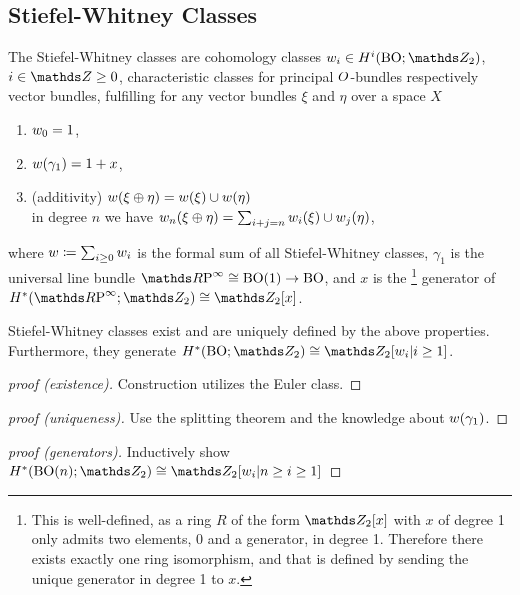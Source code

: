 \subsection{Stiefel-Whitney Classes}
\begin{Def}
  The Stiefel-Whitney classes are cohomology classes
  $w_i\in H^i(\BO;\Zmod2)$, $i\in\Z\geq0$,
  \idest characteristic classes for principal $O$-bundles
  respectively vector bundles, fulfilling
  for any vector bundles $\xi$ and $\eta$ over a space $X$
  \begin{enumerate}
  \item $\w_0%
    = 1$,
  \item $w(\gamma_1) = 1 + x$,
  \item (additivity) $w(\xi \oplus \eta) = w(\xi)\cup w(\eta)$
    \\\idest in degree $n$ we have
    $w_n(\xi\oplus\eta) = \sum_{i+j=n}w_i(\xi) \cup w_j(\eta)$,
  \end{enumerate}
  where
  $w\coloneqq\sum_{i\geq 0}w_i$ is the formal sum of all
  Stiefel-Whitney classes,
  $\gamma_1$ is the universal line bundle $\RP\cong\BO(1)\to\BO$,
  and $x$ is the%
  \footnote{
    This is well-defined, as a ring $R$ of the form $\Zmod2[x]$
    with $x$ of degree 1 only admits two elements, $0$ and a
    generator, in degree 1. Therefore there exists exactly one ring
    isomorphism, and that is defined by sending the unique generator in
    degree 1 to $x$.
  }
  generator of $H^*(\RP;\Zmod2)\cong\Zmod2[x]$.
\end{Def}

\begin{Thm} %
Stiefel-Whitney classes exist and are uniquely defined by the above
properties. Furthermore, they generate $H^*(\BO;\Zmod2)\cong \Zmod2[\w_i|i\geq1]$.
\begin{proof}[proof (existence)]
  Construction utilizes the Euler class.
\end{proof}
\begin{proof}[proof (uniqueness)]
  Use the splitting theorem and the knowledge about $w(\gamma_1)$.
\end{proof}
\begin{proof}[proof (generators)]
  Inductively show $H^*(\BO(n);\Zmod2)\cong \Zmod2[\w_i|n\geq i\geq1]$
\end{proof}
\end{Thm}

